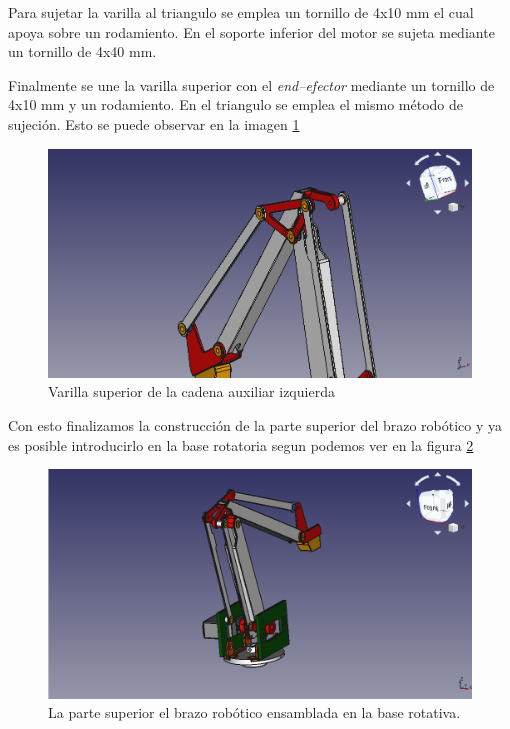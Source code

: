Para sujetar la varilla al triangulo se emplea un tornillo de 4x10 mm el cual apoya sobre un rodamiento. En el soporte inferior del motor se sujeta mediante un tornillo de 4x40 mm.

Finalmente se une la varilla superior con el \textit{end--efector} mediante un tornillo de 4x10 mm y un rodamiento. En el triangulo se emplea el mismo método de sujeción. Esto se puede observar en la imagen \ref{fig:varilla_superior_izquierda}

\begin{figure}[H]
    \centering 
    \includegraphics[width=1\linewidth]{pictures/VarillaSuperior.png}
    \caption{Varilla superior de la cadena auxiliar izquierda}
    \label{fig:varilla_superior_izquierda}
\end{figure}

Con esto finalizamos la construcción de la parte superior del brazo robótico y ya es posible introducirlo en la base rotatoria segun podemos ver en la figura \ref{fig:parte_superio_ensamblada_base}

\begin{figure}[H]
    \centering 
    \includegraphics[width=1\linewidth]{pictures/ParteSuperiorDelBrazoEnElSoporte.png}
    \caption{La parte superior el brazo robótico ensamblada en la base rotativa.}
    \label{fig:parte_superio_ensamblada_base}
\end{figure}

